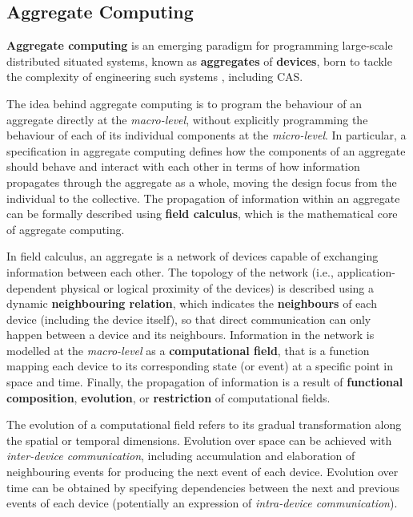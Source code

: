 
\subsection{Aggregate Computing}
\label{section:background:concepts:aggregate-computing}

\textbf{Aggregate computing} is an emerging paradigm for programming large-scale
distributed situated systems, known as \textbf{aggregates} of \textbf{devices},
born to tackle the complexity of engineering such systems
\cite{FieldCalculus-AggregateComputing}, including \ac{CAS}.

The idea behind aggregate computing is to program the behaviour of an aggregate
directly at the \textit{macro-level}, without explicitly programming the
behaviour of each of its individual components at the \textit{micro-level}. In
particular, a specification in aggregate computing defines how the components
of an aggregate should behave and interact with each other in terms of how
information propagates through the aggregate as a whole, moving the design
focus from the individual to the collective. The propagation of information
within an aggregate can be formally described using \textbf{field calculus},
which is the mathematical core of aggregate computing.

In field calculus, an aggregate is a network of devices capable of exchanging
information between each other. The topology of the network (i.e.,
application-dependent physical or logical proximity of the devices) is
described using a dynamic \textbf{neighbouring relation}, which indicates the
\textbf{neighbours} of each device (including the device itself), so that
direct communication can only happen between a device and its neighbours.
Information in the network is modelled at the \textit{macro-level} as a
\textbf{computational field}, that is a function mapping each device to its
corresponding state (or event) at a specific point in space and time. Finally,
the propagation of information is a result of \textbf{functional composition},
\textbf{evolution}, or \textbf{restriction} of computational fields.

The evolution of a computational field refers to its gradual transformation
along the spatial or temporal dimensions. Evolution over space can be achieved
with \textit{inter-device communication}, including accumulation and
elaboration of neighbouring events for producing the next event of each device.
Evolution over time can be obtained by specifying dependencies between the next
and previous events of each device (potentially an expression of
\textit{intra-device communication}).

